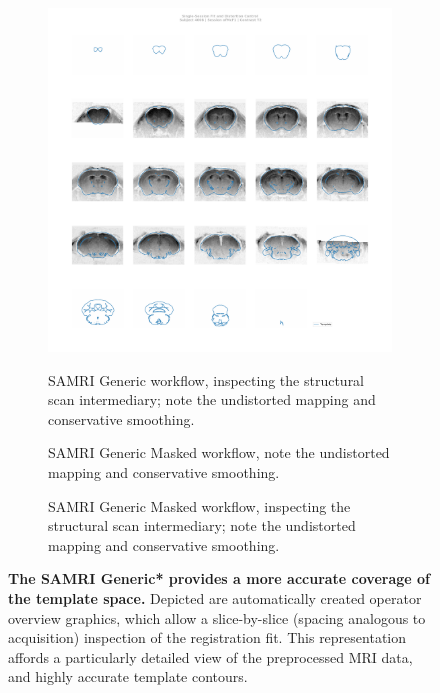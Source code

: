 \begin{figure}[h!]
\begin{subfigure}[t]{0.48\textwidth}
{			\includegraphics[width=\textwidth]{data/manual_overview/generic/4008_ofMcF1_T2w} 
			}
		\caption{
			SAMRI Generic workflow, inspecting the structural scan intermediary; note the undistorted mapping and conservative smoothing.
			\vspace{1em}
			}
		\label{fig:fit_gga}
	\end{subfigure}
	\begin{subfigure}[t]{0.48\textwidth}
		\centering
		\setlength{\fboxsep}{0pt}%
		\setlength{\fboxrule}{0.2pt}%
		\caption{
			SAMRI Generic Masked workflow, note the undistorted mapping and conservative smoothing.
			}
		\label{fig:fit_ll}
	\end{subfigure}\hfill
	\begin{subfigure}[t]{0.48\textwidth}
		\centering
		\setlength{\fboxsep}{0pt}%
		\setlength{\fboxrule}{0.2pt}%
		\caption{
			SAMRI Generic Masked workflow, inspecting the structural scan intermediary; note the undistorted mapping and conservative smoothing.
			}
		\label{fig:fit_lg}
	\end{subfigure}
	\caption{
		\textbf{The SAMRI Generic* provides a more accurate coverage of the template space.}
		Depicted are automatically created operator overview graphics, which allow a slice-by-slice (spacing analogous to acquisition) inspection of the registration fit.
		This representation affords a particularly detailed view of the preprocessed MRI data, and highly accurate template contours.
		}
	\label{fig:fit}
\end{figure}

